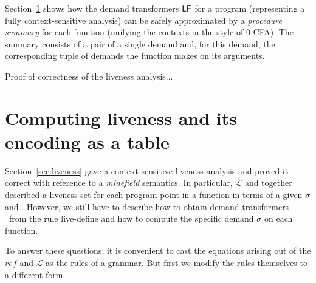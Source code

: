 \documentclass[9pt]{sigplanconf}
\newcommand{\mycomment}[1]{}
\begin{document}
\mycomment{The function  $\mathcal{L}$ now gives  the (total) liveness
  of  an   expression  $e$.   The  cases  $\SRETURN$   and  $\SIF$  are
  straightforward, but note the liveness $x.\epsilon$ generated by the
  latter.   The case  $(\LET\  z\leftarrow s\  \IN\  e')$ resembles  a
  three-address instruction:  the liveness of  $e$ is given  by taking
  the liveness, $\Lv$, of $e'$, killing any liveness of $z$ and adding
  any incremental  liveness from  $s$.  The main  subtlety is  how the
  liveness of  $z$ in $\Lv$  is converted to  a demand $\Lv(z)$  to be
  placed on $s$ via $\mathit{ref}(s,\Lv(z),\Lfonly)$.


We make three observations: firstly the rule ({\sc live-define}) has a
least  solution  as  $\mathcal{L}(\cdot)$  is monotonic  in  $\sigma$;
secondly  that  ({\sc  live-define})   resembles  the  rule  for  type
inference of mutually recursive  function definitions, and thirdly the
asymmetry of  demand and liveness (compared to  post- and pre-liveness
classically) is due to the functional formulation here.
}%

Section~\ref{sec:computing}   shows   how   the  demand   transformers
$\mathsf{LF}$  for  a  program  (representing  a  fully  context-sensitive
analysis) can be safely approximated  by a {\em procedure summary} for
each function  (unifying the contexts  in the style of  0-CFA)\@.  The
summary consists  of a pair of  a single demand and,  for this demand,
the  corresponding  tuple  of   demands  the  function  makes  on  its
arguments.

{\color{red} Proof of correctness of the liveness analysis...}


\section{Computing liveness and its encoding as a
table}\label{sec:computing}
Section~\ref{sec:liveness} gave  a context-sensitive liveness analysis
and  {\color  {red}  proved  it  correct  with  reference  to  a  {\em
    minefield} semantics}.  In  particular, $\mathcal{L}$ and 
together described a liveness set for each program point in a function
in terms of  a given $\sigma$ and \Lfonly.  However,  we still have to
describe how to obtain demand transformers \Lfonly\ from the rule {\sc
  live-define} and how to compute the specific demand $\sigma$ on each
function.

To  answer these  questions, it  is convenient  to cast  the equations
arising out of the $\mathit{ref}$  and $\mathcal{L}$ as the rules of a
grammar.   But first  we modify  the rules  themselves to  a different
form.
\end{document}
